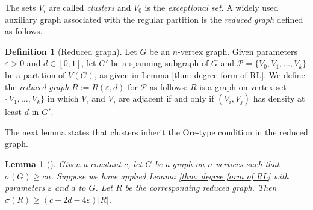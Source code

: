 \documentclass[11pt, a4paper]{article}
\newtheorem{lemma}[theorem]{Lemma}
\theoremstyle{definition}
\newtheorem{definition}[theorem]{Definition}
\newcommand{\eps}{\varepsilon}
\newcommand{\<}{\subseteq}
\begin{document}
The sets $V_i$ are called \textit{clusters} and  $V_0$ is the \textit{exceptional set}. 
A widely used auxiliary graph associated with the regular partition is the \textit{reduced graph} defined as follows. %
\begin{definition}[Reduced graph]
Let $G$ be an $n$-vertex graph. Given parameters $\eps>0$ and $d\in [0,1]$, let $G'$ be a spanning subgraph of $G$ and $\mathcal{P}=\{V_0,V_1, \dots,V_k\}$ be a partition of $V(G)$, as given in Lemma \ref{thm: degree form of RL}. We define the \textit{reduced graph} $R:=R(\eps,d)$ for $\mathcal{P}$ as follows: %
$R$ is a graph on vertex set $\{V_1,\ldots,V_k\}$ in which $V_i$ and $V_j$ are adjacent if and only if $(V_i,V_j)$ has density at least $d$ in $G'$.
\end{definition}


The next lemma states that clusters inherit the Ore-type condition in the reduced graph.
\begin{lemma}[\cite{Kuhn}]\label{reduced graph}
    Given a constant $c$, let $G$ be a graph on $n$ vertices such that $\sigma(G)\geq cn$. Suppose we have applied Lemma \ref{thm: degree form of RL} with parameters $\eps$ and $d$
 to $G$. Let $R$ be the corresponding reduced graph. Then $\sigma(R)\geq (c-2d-4\eps)|R|$.
\end{lemma}
\end{document}
